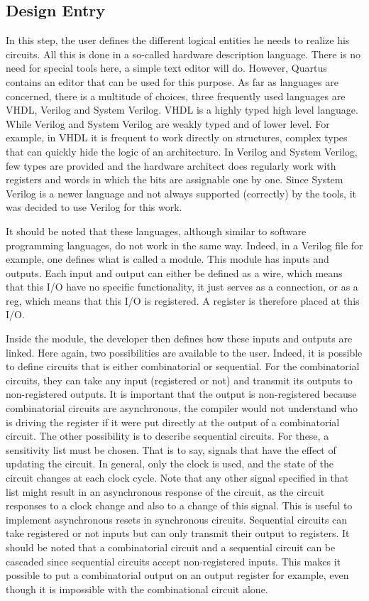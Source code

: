 \subsection{Design Entry}

In this step, the user defines the different logical entities he needs to realize his circuits. 
All this is done in a so-called hardware description language. There is no need for special tools 
here, a simple text editor will do. However, Quartus contains an editor that can be used for this 
purpose. As far as languages are concerned, there is a multitude of choices, three frequently used 
languages are VHDL, Verilog and System Verilog. VHDL is a highly typed high level language. While 
Verilog and System Verilog are weakly typed and of lower level. For example, in VHDL it is 
frequent to work directly on structures, complex types that can quickly hide the logic of an 
architecture. In Verilog and System Verilog, few types are provided and the hardware architect does 
regularly work with registers and words in which the bits are assignable one by one. Since System 
Verilog is a newer language and not always supported (correctly) by the tools, it was decided to use 
Verilog for this work. 

It should be noted that these languages, although similar to software programming languages, do not 
work in the same way. Indeed, in a Verilog file for example, one defines what is called a module. 
This module has inputs and outputs. Each input and output can either be defined as a wire, 
which means that this I/O have no specific functionality, it just serves as a connection, or 
as a reg, which means that this I/O is registered. A register is therefore placed at this I/O. 

Inside the module, the developer then defines how these inputs and outputs are linked. Here again, 
two possibilities are available to the user. Indeed, it is possible to define circuits that is 
either combinatorial or sequential. For the combinatorial circuits, they can take any input 
(registered or not) and transmit its outputs to non-registered outputs. It is important that the 
output is non-registered because combinatorial circuits are asynchronous, the compiler would not 
understand who is driving the register if it were put directly at the output of a combinatorial 
circuit. The other possibility is to describe sequential circuits. For these, a sensitivity list 
must be chosen. That is to say, signals that have the effect of updating the circuit. In 
general, only the clock is used, and the state of the circuit changes at each clock cycle. Note that
any other signal specified in that list might result in an asynchronous response of the circuit, as
the circuit responses to a clock change and also to a change of this signal. This is useful to
implement asynchronous resets in synchronous circuits. Sequential circuits can take registered or
not inputs but can only transmit their output to registers. It should be noted that a combinatorial 
circuit and a sequential circuit can be cascaded since sequential circuits accept non-registered 
inputs. This makes it possible to put a combinatorial output on an output register for example, even
though it is impossible with the combinational circuit alone. 

